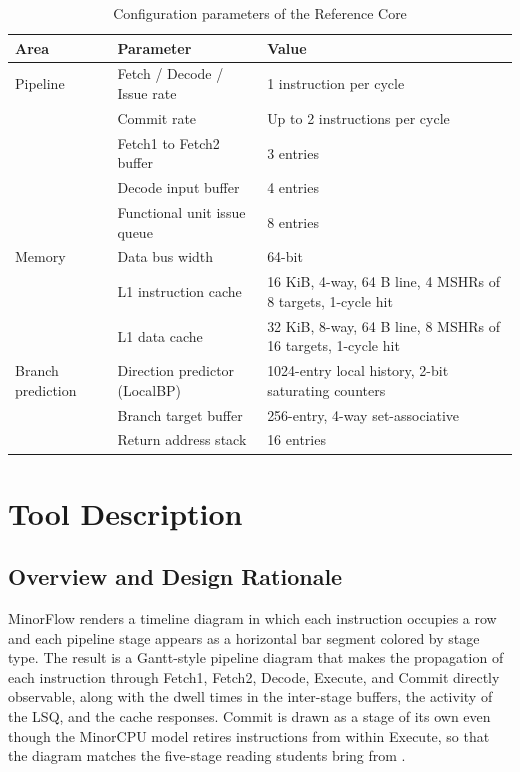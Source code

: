 \documentclass[runningheads,a4paper]{llncs}
\begin{document}
\begin{table}[!ht]
\centering
\caption{Configuration parameters of the Reference Core}
\label{tab:processor_specs}
\begin{tabularx}{\textwidth}{llX}
\toprule
\textbf{Area} & \textbf{Parameter} & \textbf{Value} \\
\midrule
Pipeline & Fetch / Decode / Issue rate & 1 instruction per cycle \\
         & Commit rate & Up to 2 instructions per cycle \\
         & Fetch1 to Fetch2 buffer & 3 entries \\
         & Decode input buffer & 4 entries \\
         & Functional unit issue queue & 8 entries \\
\midrule
Memory & Data bus width & 64-bit \\
       & L1 instruction cache & 16 KiB, 4-way, 64 B line, 4 MSHRs of 8 targets, 1-cycle hit \\
       & L1 data cache & 32 KiB, 8-way, 64 B line, 8 MSHRs of 16 targets, 1-cycle hit \\
\midrule
Branch prediction & Direction predictor (LocalBP) & 1024-entry local history, 2-bit saturating counters \\
                  & Branch target buffer & 256-entry, 4-way set-associative \\
                  & Return address stack & 16 entries \\
\bottomrule
\end{tabularx}
\end{table}

\section{Tool Description}
\label{sec:description}

\subsection{Overview and Design Rationale}

MinorFlow renders a timeline diagram in which each instruction occupies a row and each pipeline stage appears as a horizontal bar segment colored by stage type. The result is a Gantt-style pipeline diagram that makes the propagation of each instruction through Fetch1, Fetch2, Decode, Execute, and Commit directly observable, along with the dwell times in the inter-stage buffers, the activity of the LSQ, and the cache responses. Commit is drawn as a stage of its own even though the MinorCPU model retires instructions from within Execute, so that the diagram matches the five-stage reading students bring from \cite{patterson2020computer}.
\end{document}
